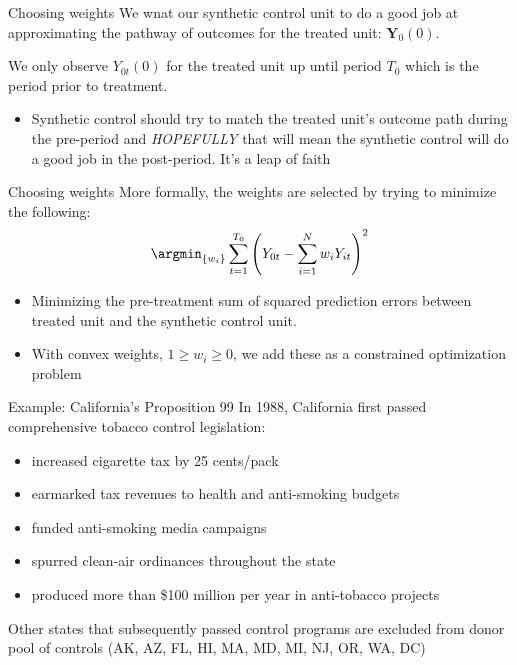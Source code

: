 \documentclass[t]{beamer}
\begin{document}
\begin{frame}{Choosing weights}
  We wnat our synthetic control unit to do a good job at approximating the pathway of outcomes for the treated unit: $\bm{Y}_0(0)$.

  \pause
  \bigskip
  We only observe $Y_{0t}(0)$ for the treated unit up until period $T_0$ which is the period prior to treatment. 
  \begin{itemize}
    \item Synthetic control should try to match the treated unit's outcome path during the pre-period and \emph{HOPEFULLY} that will mean the synthetic control will do a good job in the post-period. It's a leap of faith
  \end{itemize}
\end{frame}

\begin{frame}{Choosing weights}
  More formally, the weights are selected by trying to minimize the following:
  $$
    \argmin_{ \{ w_i \} } \sum_{t=1}^{T_0} \left( Y_{0t} - \sum_{i=1}^N w_i Y_{it} \right)^2
  $$
  \begin{itemize}
    \item Minimizing the pre-treatment sum of squared prediction errors between treated unit and the synthetic control unit.
    \item With convex weights, $1 \geq w_i \geq 0$, we add these as a constrained optimization problem
  \end{itemize}
\end{frame}


\begin{frame}{Example: California's Proposition 99}
	In 1988, California first passed comprehensive tobacco control legislation:
  \begin{itemize}
		\item increased cigarette tax by 25 cents/pack
		\item earmarked tax revenues to health and anti-smoking budgets
		\item funded anti-smoking media campaigns
		\item spurred clean-air ordinances throughout the state
		\item produced more than \$100 million per year in anti-tobacco projects
  \end{itemize}
	
  \bigskip Other states that subsequently passed control programs are excluded from donor pool of controls (AK, AZ, FL, HI, MA, MD, MI, NJ, OR, WA, DC)
\end{frame}
\end{document}
